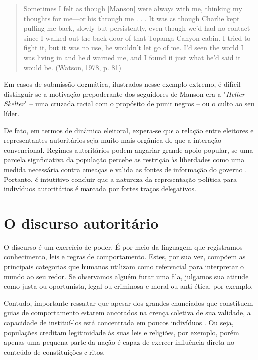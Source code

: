 \documentclass[
12pt,				%
openright,			%
twoside,			%
a4paper,			%
english,			%
french,				%
spanish,			%
brazil				%
]{abntex2}
\begin{document}
\begin{quote}
	Sometimes I felt as though [Manson] were always with me, thinking my
	thoughts for me—or his through me . . . It was as though Charlie kept
	pulling me back, slowly but persistently, even though we’d had no contact
	since I walked out the back door of that Topanga Canyon cabin. I tried to
	fight it, but it was no use, he wouldn’t let go of me. I’d seen the world I was
	living in and he’d warned me, and I found it just what he’d said it would be. (Watson, 1978, p. 81)
\end{quote}

Em casos de submissão dogmática, ilustrados nesse exemplo extremo, é difícil distinguir se a motivação prepoderante dos seguidores de Manson era a "\emph{Helter Skelter}" -- uma cruzada racial com o propósito de punir negros -- ou o culto ao seu líder.

De fato, em termos de dinâmica eleitoral, expera-se que a relação entre eleitores e representantes autoritários seja muito mais orgânica do que a interação convencional. Regimes autoritários podem angariar grande apoio popular, se uma parcela signficiativa da população percebe as restrição às liberdades como uma medida necessária contra ameaças e valida as fontes de informação do governo \cite{geddes1989sources, stein2013unraveling}. Portanto, é intutitivo concluir que a natureza da representação política para indivíduos autoritários é marcada por fortes traços delegativos.

\section{O discurso autoritário}

O discurso é um exercício de poder. É por meio da linguagem que registramos conhecimento, leis e regras de comportamento. Estes, por sua vez, compõem as principais categorias que humanos utilizam como referencial para interpretar o mundo ao seu redor. Se observamos alguém furar uma fila, julgamos sua atitude como justa ou oportunista, legal ou criminosa e moral ou anti-ética, por exemplo.  

Contudo, importante ressaltar que apesar dos grandes enunciados que constituem guias de comportamento estarem ancorados na crença coletiva de sua validade, a capacidade de instituí-los está concentrada em poucos indivíduos \cite{foucault1969archeologie}. Ou seja, populações creditam legitimidade às suas leis e religiões, por exemplo, porém apenas uma pequena parte da nação é capaz de exercer influência direta no conteúdo de constituições e ritos.
\end{document}
